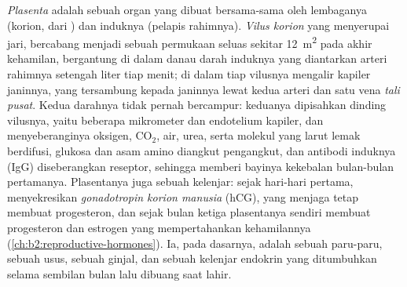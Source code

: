 \begin{definition}[Plasenta]\label{def:b2:mammal-reproduction:placenta}
\emph{Plasenta} adalah sebuah organ yang dibuat bersama-sama oleh
lembaganya (korion, dari ) dan induknya (pelapis
rahimnya). \emph{Vilus korion} yang menyerupai jari, bercabang menjadi
sebuah permukaan seluas sekitar \qty{12}{m^2} pada akhir kehamilan,
bergantung di dalam danau darah induknya yang diantarkan arteri
rahimnya setengah liter tiap menit; di dalam tiap vilusnya mengalir
kapiler janinnya, yang tersambung kepada janinnya lewat kedua arteri
dan satu vena \emph{tali pusat}. Kedua darahnya tidak pernah bercampur:
keduanya dipisahkan dinding vilusnya, yaitu beberapa mikrometer
 dan endotelium kapiler, dan menyeberanginya oksigen,
$\mathrm{CO_2}$, air, urea, serta molekul yang larut lemak berdifusi,
glukosa dan asam amino diangkut pengangkut, dan antibodi induknya
(IgG) diseberangkan reseptor, sehingga memberi bayinya kekebalan
bulan-bulan pertamanya. Plasentanya juga sebuah kelenjar: sejak
hari-hari pertama,  menyekresikan \emph{gonadotropin
korion manusia} (hCG), yang menjaga  tetap
membuat progesteron, dan sejak bulan ketiga plasentanya sendiri membuat
progesteron dan estrogen yang mempertahankan kehamilannya
(\cref{ch:b2:reproductive-hormones}). Ia, pada dasarnya, adalah sebuah
paru-paru, sebuah usus, sebuah ginjal, dan sebuah kelenjar endokrin
yang ditumbuhkan selama sembilan bulan lalu dibuang saat lahir.
\end{definition}

